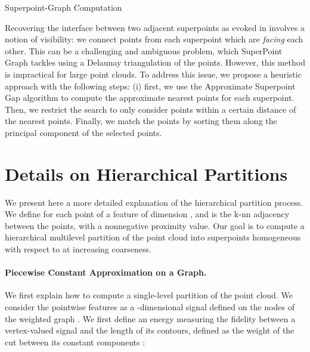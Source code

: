 \begin{algorithm}
\caption{Superpoint-Graph Computation}\label{alg:segmentnn}
\begin{algorithmic}

    \For{}
        \State{ }
        \State{ }
    \EndFor
    
    \State{}
    
    \State{}
    
    \For{}
        \If{}
        \EndIf
    \EndFor
    
    \For{}
        \State{}
        \If{}
        \EndIf
    \EndFor
{}

\end{algorithmic}
\end{algorithm}
\fi

Recovering the interface between two adjacent superpoints as evoked in  involves a notion of visibility: we connect points from each superpoint which are \emph{facing} each other. This can be a challenging and ambiguous problem, which SuperPoint Graph \cite{landrieu2016cut} tackles using a Delaunay triangulation of the points. However, this method is impractical for large point clouds. To address this issue, we propose a heuristic approach with the following steps: (i) first, we use the Approximate Superpoint Gap algorithm to compute the approximate nearest points for each superpoint. Then, we restrict the search to only consider points within a certain distance of the nearest points. Finally, we match the points by sorting them along the principal component of the selected points.

\section{Details on Hierarchical Partitions}
\label{sec:pcp}
We present here a more detailed explanation of the hierarchical partition process. We define for each point  of  a feature  of dimension , and  is the k-nn adjacency between the points, with  a nonnegative proximity value. Our goal is to compute a hierarchical multilevel partition of the point cloud into superpoints homogeneous with respect to  at increasing coarseness. 

\paragraph{Piecewise Constant Approximation on a Graph.}
We first explain how to compute a single-level partition of the point cloud.
We consider the pointwise features  as a -dimensional signal  defined on the nodes of the weighted graph . 
We first define an energy  measuring the fidelity between a vertex-valued signal  and the length of its contours, defined as the weight of the cut between its constant components \cite{landrieu2016cut}:

